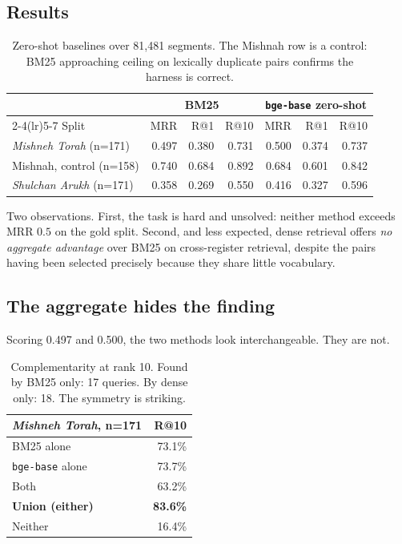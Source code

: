 \documentclass[11pt,a4paper]{article}
\begin{document}
\subsection{Results}

\begin{table}[h]
\centering
\begin{tabular}{lrrrrrr}
\toprule
& \multicolumn{3}{c}{BM25} & \multicolumn{3}{c}{\texttt{bge-base} zero-shot} \\
\cmidrule(lr){2-4}\cmidrule(lr){5-7}
Split & MRR & R@1 & R@10 & MRR & R@1 & R@10 \\
\midrule
\emph{Mishneh Torah} (n=171) & 0.497 & 0.380 & 0.731 & 0.500 & 0.374 & 0.737 \\
Mishnah, control (n=158) & 0.740 & 0.684 & 0.892 & 0.684 & 0.601 & 0.842 \\
\emph{Shulchan Arukh} (n=171) & 0.358 & 0.269 & 0.550 & 0.416 & 0.327 & 0.596 \\
\bottomrule
\end{tabular}
\caption{Zero-shot baselines over 81{,}481 segments. The Mishnah row is a
control: BM25 approaching ceiling on lexically duplicate pairs confirms the
harness is correct.}
\label{tab:baselines}
\end{table}

Two observations. First, the task is hard and unsolved: neither method exceeds
MRR $0.5$ on the gold split. Second, and less expected, dense retrieval offers
\emph{no aggregate advantage} over BM25 on cross-register retrieval, despite the
pairs having been selected precisely because they share little vocabulary.

\subsection{The aggregate hides the finding}

Scoring 0.497 and 0.500, the two methods look interchangeable. They are not.

\begin{table}[h]
\centering
\begin{tabular}{lr}
\toprule
\emph{Mishneh Torah}, n=171 & R@10 \\
\midrule
BM25 alone & 73.1\% \\
\texttt{bge-base} alone & 73.7\% \\
Both & 63.2\% \\
\textbf{Union (either)} & \textbf{83.6\%} \\
Neither & 16.4\% \\
\bottomrule
\end{tabular}
\caption{Complementarity at rank 10. Found by BM25 only: 17 queries. By dense
only: 18. The symmetry is striking.}
\label{tab:complement}
\end{table}
\end{document}
